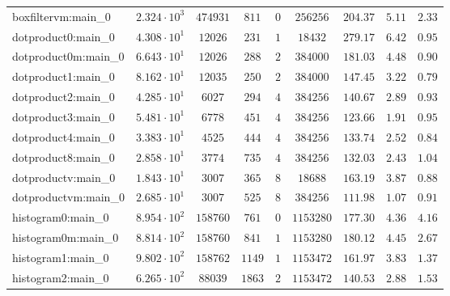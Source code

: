 \begin{tabular}{|l|c|c|c|c|c|c|c|c|}
boxfiltervm:main\_0            & $ 2.324 \cdot 10^{3} $ & $ 474931   $ & $ 811    $ & $ 0    $ & $ 256256   $ & $ 204.37      $ & $ 5.11    $ & $ 2.33    $ \\
dotproduct0:main\_0            & $ 4.308 \cdot 10^{1} $ & $ 12026    $ & $ 231    $ & $ 1    $ & $ 18432    $ & $ 279.17      $ & $ 6.42    $ & $ 0.95    $ \\
dotproduct0m:main\_0           & $ 6.643 \cdot 10^{1} $ & $ 12026    $ & $ 288    $ & $ 2    $ & $ 384000   $ & $ 181.03      $ & $ 4.48    $ & $ 0.90    $ \\
dotproduct1:main\_0            & $ 8.162 \cdot 10^{1} $ & $ 12035    $ & $ 250    $ & $ 2    $ & $ 384000   $ & $ 147.45      $ & $ 3.22    $ & $ 0.79    $ \\
dotproduct2:main\_0            & $ 4.285 \cdot 10^{1} $ & $ 6027     $ & $ 294    $ & $ 4    $ & $ 384256   $ & $ 140.67      $ & $ 2.89    $ & $ 0.93    $ \\
dotproduct3:main\_0            & $ 5.481 \cdot 10^{1} $ & $ 6778     $ & $ 451    $ & $ 4    $ & $ 384256   $ & $ 123.66      $ & $ 1.91    $ & $ 0.95    $ \\
dotproduct4:main\_0            & $ 3.383 \cdot 10^{1} $ & $ 4525     $ & $ 444    $ & $ 4    $ & $ 384256   $ & $ 133.74      $ & $ 2.52    $ & $ 0.84    $ \\
dotproduct8:main\_0            & $ 2.858 \cdot 10^{1} $ & $ 3774     $ & $ 735    $ & $ 4    $ & $ 384256   $ & $ 132.03      $ & $ 2.43    $ & $ 1.04    $ \\
dotproductv:main\_0            & $ 1.843 \cdot 10^{1} $ & $ 3007     $ & $ 365    $ & $ 8    $ & $ 18688    $ & $ 163.19      $ & $ 3.87    $ & $ 0.88    $ \\
dotproductvm:main\_0           & $ 2.685 \cdot 10^{1} $ & $ 3007     $ & $ 525    $ & $ 8    $ & $ 384256   $ & $ 111.98      $ & $ 1.07    $ & $ 0.91    $ \\
histogram0:main\_0             & $ 8.954 \cdot 10^{2} $ & $ 158760   $ & $ 761    $ & $ 0    $ & $ 1153280  $ & $ 177.30      $ & $ 4.36    $ & $ 4.16    $ \\
histogram0m:main\_0            & $ 8.814 \cdot 10^{2} $ & $ 158760   $ & $ 841    $ & $ 1    $ & $ 1153280  $ & $ 180.12      $ & $ 4.45    $ & $ 2.67    $ \\
histogram1:main\_0             & $ 9.802 \cdot 10^{2} $ & $ 158762   $ & $ 1149   $ & $ 1    $ & $ 1153472  $ & $ 161.97      $ & $ 3.83    $ & $ 1.37    $ \\
histogram2:main\_0             & $ 6.265 \cdot 10^{2} $ & $ 88039    $ & $ 1863   $ & $ 2    $ & $ 1153472  $ & $ 140.53      $ & $ 2.88    $ & $ 1.53    $ \\

\end{tabular}
